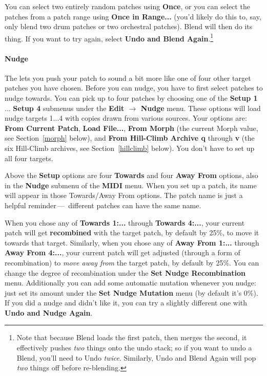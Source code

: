 \documentclass{article}
\begin{document}
You can select two entirely random patches using {\bf Once}, or you can select the patches from a patch range using {\bf Once in Range...} (you'd likely do this to, say, only blend two drum patches or two orchestral patches).   Blend will then do its thing.  If you want to try again, select {\bf Undo and Blend Again}.\footnote{Note that because Blend loads the first patch, then merges the second, it effectively pushes {\it two} things onto the undo stack; so if you want to undo a Blend, you'll need to Undo {\it twice}.  Similarly, Undo and Blend Again will pop {\it two} things off before re-blending.}

\vspace{-0.6em}
\paragraph{Nudge}  The lets you push your patch to sound a bit more like one of four other target patches you have chosen.   Before you can nudge, you have to first select patches to nudge towards.  You can pick up to four patches by choosing one of the {\bf Setup 1} ... {\bf Setup 4} submenus under the {\bf Edit \(\rightarrow\) Nudge} menu.  These options will load nudge targets 1...4 with copies drawn from various sources.   Your options are: {\bf From Current Patch}, {\bf Load File...}, {\bf From Morph} (the current Morph value, see Section~\ref{morph} below), and {\bf From Hill-Climb Archive q} through {\bf v} (the six Hill-Climb archives, see Section~\ref{hillclimb} below). You don't have to set up all four targets.

Above the {\bf Setup} options are four {\bf Towards} and four {\bf Away From} options, also in the {\bf Nudge} submenu of the {\bf MIDI} menu.  When you set up a patch, its name will appear in those Towards/Away From options.  The patch name is just a helpful reminder\,---\, different patches can have the same name.

When you chose any of {\bf Towards 1:...} through {\bf Towards 4:...}, your current patch will get {\bf recombined} with the target patch, by default by 25\%, to move it towards that target.    Similarly, when you chose any of {\bf Away From 1:...} through {\bf Away From 4:...}, your current patch will get adjusted (through a form of recombination) to {\it move away from} the target patch, by default by 25\%.  You can change the degree of recombination under the {\bf Set Nudge Recombination} menu.  Additionally you can add some automatic mutation whenever you nudge: just set its amount under the {\bf Set Nudge Mutation} menu (by default it's 0\%). If you did a nudge and didn't like it, you can try a slightly different one with {\bf Undo and Nudge Again}.
\end{document}
